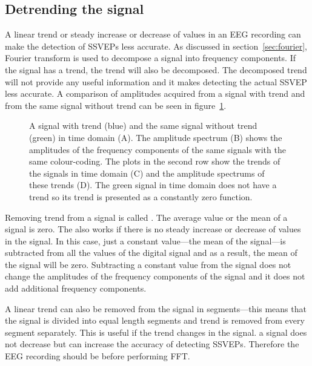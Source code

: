\subsection{Detrending the signal}
\label{sec:detrend}

A linear \gls{trend} or steady increase or decrease of values in an \gls{EEG} recording can make the detection of \glspl{SSVEP} less accurate. As discussed in section~\ref{sec:fourier}, \gls{Fourier transform} is used to decompose a signal into \glspl{frequency component}. If the signal has a \gls{trend}, the \gls{trend} will also be decomposed. The decomposed \gls{trend} will not provide any useful information and it makes detecting the actual \gls{SSVEP} less accurate. A comparison of amplitudes acquired from a signal with trend and from the same signal without \gls{trend} can be seen in figure~\ref{fig:detrend}.

\begin{figure}[h!]
	
	\caption{A signal with trend (blue) and the same signal without trend (green) in time domain (A). The amplitude spectrum (B) shows the amplitudes of the frequency components of the same signals with the same colour-coding. The plots in the second row show the trends of the signals in time domain (C) and the amplitude spectrums of these trends (D). The green signal in time domain does not have a trend so its trend is presented as a constantly zero function.}
	\label{fig:detrend}
\end{figure}

Removing \gls{trend} from a signal is called . The average value or the \gls{mean} of a  signal is zero. The  also works if there is no steady increase or decrease of values in the signal. In this case, just a constant value---the \gls{mean} of the signal---is subtracted from all the values of the \gls{digital signal} and as a result, the \gls{mean} of the signal will be zero. Subtracting a constant value from the signal does not change the amplitudes of the \glspl{frequency component} of the signal and it does not add additional \glspl{frequency component}.

A linear \gls{trend} can also be removed from the signal in segments---this means that the signal is divided into equal length segments and \gls{trend} is removed from every segment separately. This is useful if the \gls{trend} changes in the signal.  a signal does not decrease but can increase the accuracy of detecting \glspl{SSVEP}. Therefore the \gls{EEG} recording should be  before performing \gls{FFT}.

